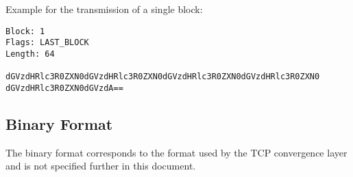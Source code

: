 \documentclass[12pt, a4paper]{scrartcl}
\begin{document}
Example for the transmission of a single block:\\
\makebox[\textwidth]{\hrulefill}
\begin{verbatim}
Block: 1
Flags: LAST_BLOCK
Length: 64

dGVzdHRlc3R0ZXN0dGVzdHRlc3R0ZXN0dGVzdHRlc3R0ZXN0dGVzdHRlc3R0ZXN0
dGVzdHRlc3R0ZXN0dGVzdA==

\end{verbatim}
\makebox[\textwidth]{\hrulefill}
\subsection{Binary Format}
\label{sec:binaryformat}
The binary format corresponds to the format used by the TCP convergence layer and is not specified further in this document.
\end{document}
